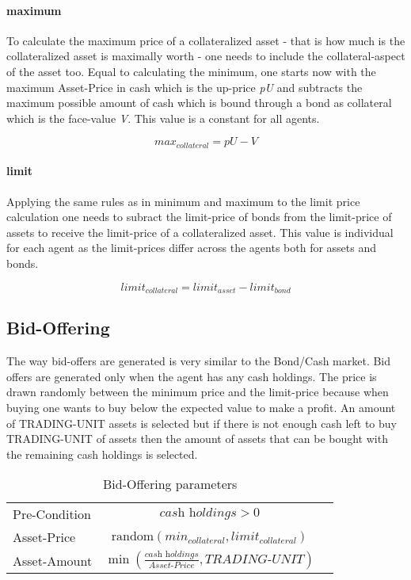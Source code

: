 \documentclass[Bachelorarbeit.tex]{subfiles}
\begin{document}
\paragraph{maximum}
To calculate the maximum price of a collateralized asset - that is how much is the collateralized asset is maximally worth - one needs to include the collateral-aspect of the asset too. Equal to calculating the minimum, one starts now with the maximum Asset-Price in cash which is the up-price \textit{pU} and subtracts the maximum possible amount of cash which is bound through a bond as collateral which is the face-value \textit{V}. This value is a constant for all agents.

\begin{equation}
max_{collateral} = \textit{pU} - \textit{V}
\end{equation}

\paragraph{limit}
Applying the same rules as in minimum and maximum to the limit price calculation one needs to subract the limit-price of bonds from the limit-price of assets to receive the limit-price of a collateralized asset. This value is individual for each agent as the limit-prices differ across the agents both for assets and bonds.

\begin{equation}
limit_{collateral} = limit_{asset} - limit_{bond}
\end{equation}

\subsection{Bid-Offering}
The way bid-offers are generated is very similar to the Bond/Cash market. Bid offers are generated only when the agent has any cash holdings. The price is drawn randomly between the minimum price and the limit-price because when buying one wants to buy below the expected value to make a profit. An amount of TRADING-UNIT assets is selected but if there is not enough cash left to buy TRADING-UNIT of assets then the amount of assets that can be bought with the remaining cash holdings is selected.

\begin{table}[H]
	\centering
	\caption{Bid-Offering parameters}
	\begin{tabular} { l c r }
		\hline
		Pre-Condition & $\textit{cash holdings} > 0$  \\
		Asset-Price & $\mathrm{random}(min_{collateral}, limit_{collateral})$ \\
		Asset-Amount & $\min ( \frac{ \textit{cash holdings} }{ \textit{Asset-Price} }, \textit{TRADING-UNIT} )$ \\
		\hline
	\end{tabular}
\end{table}
\end{document}
